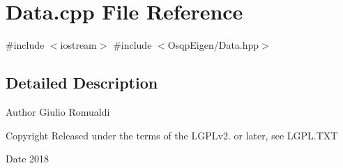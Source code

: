 \section{Data.\+cpp File Reference}
\label{Data_8cpp}
{\ttfamily \#include $<$iostream$>$}\newline
{\ttfamily \#include $<$Osqp\+Eigen/\+Data.\+hpp$>$}\newline


\subsection{Detailed Description}
\begin{DoxyAuthor}{Author}
Giulio Romualdi 
\end{DoxyAuthor}
\begin{DoxyCopyright}{Copyright}
Released under the terms of the L\+G\+P\+Lv2. or later, see L\+G\+P\+L.\+T\+XT 
\end{DoxyCopyright}
\begin{DoxyDate}{Date}
2018 
\end{DoxyDate}
